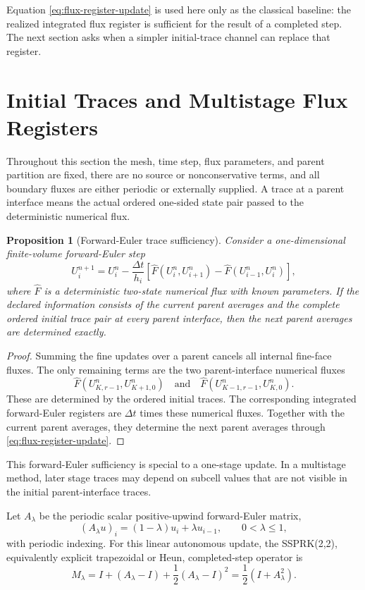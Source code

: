 \documentclass[a4paper,fleqn, sort&compress]{cas-sc}
\newtheorem{proposition}[theorem]{Proposition}
\theoremstyle{remark}
\theoremstyle{definition}
\begin{document}
Equation \eqref{eq:flux-register-update} is used here only as the classical
baseline: the realized integrated flux register is sufficient for the result
of a completed step.  The next section asks when a simpler initial-trace
channel can replace that register.

\section{Initial Traces and Multistage Flux Registers}
\label{sec:heun}

Throughout this section the mesh, time step, flux parameters, and parent
partition are fixed, there are no source or nonconservative terms, and all
boundary fluxes are either periodic or externally supplied.  A trace at a
parent interface means the actual ordered one-sided state pair passed to the
deterministic numerical flux.

\begin{proposition}[Forward-Euler trace sufficiency]
\label{prop:forward-euler-trace}
Consider a one-dimensional finite-volume forward-Euler step
\[
  U_i^{n+1}
  =
  U_i^n
  -
  \frac{\Delta t}{h_i}
  \left[
  \widehat F(U_i^n,U_{i+1}^n)
  -
  \widehat F(U_{i-1}^n,U_i^n)
  \right],
\]
where \(\widehat F\) is a deterministic two-state numerical flux with known
parameters.  If the declared information consists of the current parent
averages and the complete ordered initial trace pair at every parent
interface, then the next parent averages are determined exactly.
\end{proposition}

\begin{proof}
Summing the fine updates over a parent cancels all internal fine-face fluxes.
The only remaining terms are the two parent-interface numerical fluxes
\[
  \widehat F(U_{K,r-1}^n,U_{K+1,0}^n)
  \quad\text{and}\quad
  \widehat F(U_{K-1,r-1}^n,U_{K,0}^n).
\]
These are determined by the ordered initial traces.  The corresponding
integrated forward-Euler registers are \(\Delta t\) times these numerical
fluxes.  Together with the current parent averages, they determine the next
parent averages through \eqref{eq:flux-register-update}.
\end{proof}

This forward-Euler sufficiency is special to a one-stage update.  In a
multistage method, later stage traces may depend on subcell values that are
not visible in the initial parent-interface traces.

Let \(A_\lambda\) be the periodic scalar positive-upwind forward-Euler
matrix,
\[
  (A_\lambda u)_i=(1-\lambda)u_i+\lambda u_{i-1},
  \qquad 0<\lambda\le1,
\]
with periodic indexing.  For this linear autonomous update, the
SSPRK(2,2), equivalently explicit trapezoidal or Heun, completed-step
operator is
\[
  M_\lambda
  =
  I+(A_\lambda-I)+\frac12(A_\lambda-I)^2
  =
  \frac12(I+A_\lambda^2).
\]
\end{document}

